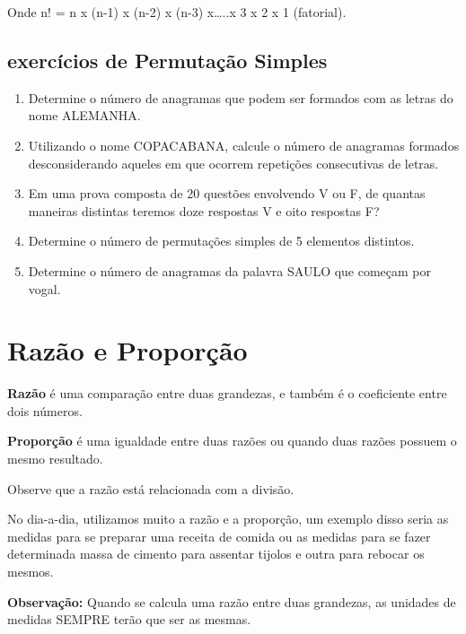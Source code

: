 \begin{multicols*}{2}

Onde n! = n x (n-1) x (n-2)  x (n-3) x…..x 3 x 2 x 1 (fatorial).

\subsection{exercícios de Permutação Simples}

			\begin{enumerate}

			\item Determine o número de anagramas que podem ser formados com as letras do nome ALEMANHA.
			
			\item Utilizando o nome COPACABANA, calcule o número de anagramas formados desconsiderando aqueles em que ocorrem repetições consecutivas de letras.
			
			\item Em uma prova composta de 20 questões envolvendo V ou F, de quantas maneiras distintas teremos doze respostas V e oito respostas F?
			
			\item Determine o número de permutações simples de 5 elementos distintos.
			
			\item Determine o número de anagramas da palavra SAULO que começam por vogal.

			\end{enumerate}

			\section*{Razão e Proporção}

			\textbf{Razão} é uma comparação entre duas grandezas, e também é o coeficiente entre dois números.
			
			\textbf{Proporção} é uma igualdade entre duas razões ou quando duas razões possuem o mesmo resultado.
			
			Observe que a razão está relacionada com a divisão.
			
			No dia-a-dia, utilizamos muito a razão e a proporção, um exemplo disso seria as medidas para se preparar uma receita de comida ou as medidas para se fazer determinada massa de cimento para assentar tijolos e outra para rebocar os mesmos.
			
			\textbf{Observação:} Quando se calcula uma razão entre duas grandezas, as unidades de medidas SEMPRE terão que ser as mesmas.
			

\end{multicols*}
